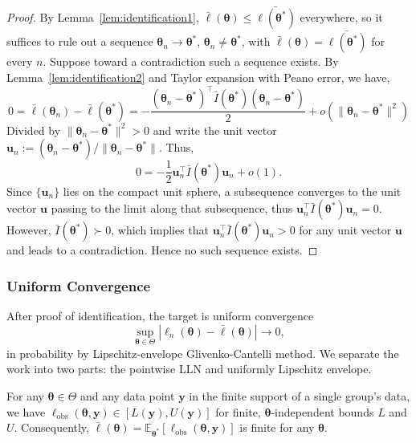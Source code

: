 \begin{proof}
    By Lemma~\ref{lem:identification1}, $\bar{\ell}(\bm{\theta})\leq \bar{\ell(\bm{\theta^{*}})}$ everywhere, so it suffices to rule out a sequence $\bm{\theta}_{n}\to \bm{\theta}^{*}$, $\bm{\theta}_{n}\neq \bm{\theta}^{*}$, with $\bar{\ell}(\bm{\theta})= \bar{\ell(\bm{\theta^{*}})}$ for every $n$. Suppose toward a contradiction such a sequence exists. By Lemma~\ref{lem:identification2} and Taylor expansion with Peano error, we have,
    \begin{equation*}
        0=\bar{\ell}(\bm{\theta}_{n})-\bar{\ell}(\bm{\theta}^{*})=-\dfrac{\left(\bm{\theta}_{n}-\bm{\theta}^{*}\right)^{\top}\bar{I}(\bm{\theta}^{*})\left(\bm{\theta}_{n}-\bm{\theta}^{*}\right)}{2}+o\left(\|\bm{\theta}_{n}-\bm{\theta}^{*}\|^{2}\right)
    \end{equation*}
    Divided by $\|\bm{\theta}_{n}-\bm{\theta}^{*}\|^{2}>0$ and write the unit vector  $\bm{u}_{n}:=\left(\bm{\theta}_{n}-\bm{\theta}^{*}\right)/\|\bm{\theta}_{n}-\bm{\theta}^{*}\|$. Thus,
    \begin{equation*}
        0=-\dfrac{1}{2}\bm{u}_{n}^{\top}\bar{I}(\bm{\theta}^{*})\bm{u}_{n}+o(1).
    \end{equation*}
    Since $\{\bm{u}_{n}\}$ lies on the compact unit sphere, a subsequence converges to the unit vector $\bm{u}$ passing to the limit along that subsequence, thus $\bm{u}_{n}^{\top}\bar{I}(\bm{\theta}^{*})\bm{u}_{n}=0$. However, $\bar{I}(\bm{\theta}^{*})\succ 0$, which implies that $\bm{u}_{n}^{\top}\bar{I}(\bm{\theta}^{*})\bm{u}_{n}>0$ for any unit vector $\bm{u}$ and leads to a contradiction. Hence no such sequence exists. 
\end{proof}
\fi

\iffalse
\subsubsection{Uniform Convergence}

After proof of identification, the target is uniform convergence 
\begin{equation}
    \sup_{\bm{\theta}\in \Theta}|\ell_{n}\left(\bm{\theta}\right)-\bar{\ell}\left(\bm{\theta}\right)|\to 0,
\end{equation}
in probability by Lipschitz-envelope Glivenko-Cantelli method. We separate the work into two parts: the pointwise LLN and uniformly Lipschitz envelope.

\begin{lemma}
    For any $\bm{\theta}\in \Theta$ and any data point $\bm{y}$ in the finite support of a single group's data, we have $\ell_{\text{obs}}\left(\bm{\theta},\bm{y}\right)\in \left[L\left(\bm{y}\right), U\left(\bm{y}\right)\right]$ for finite, $\bm{\theta}$-independent bounds $L$ and $U$. Consequently, $\bar{\ell}(\bm{\theta})=\mathbb{E}_{\bm{\theta}^{*}}[\ell_{\text{obs}}(\bm{\theta},\bm{y})]$ is finite for any $\bm{\theta}$.
    \label{lem:uniconverge1}
\end{lemma}

